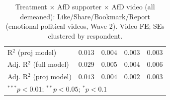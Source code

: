 \begin{table}
\begin{center}
\begin{tabular}{l c c c c}
R$^2$ (proj model)                               & $0.013$       & $0.004$       & $0.003$        & $0.003$        \\
Adj. R$^2$ (full model)                          & $0.029$       & $0.005$       & $0.004$        & $0.006$        \\
Adj. R$^2$ (proj model)                          & $0.013$       & $0.004$       & $0.002$        & $0.003$        \\
\hline
\multicolumn{5}{l}{\scriptsize{$^{***}p<0.01$; $^{**}p<0.05$; $^{*}p<0.1$}}
\end{tabular}
\caption{Treatment × AfD supporter × AfD video (all demeaned): Like/Share/Bookmark/Report (emotional political videos, Wave 2). Video FE; SEs clustered by respondent.}
\label{tab:afd_video_3way_demeaned_longterm}
\end{center}
\end{table}
